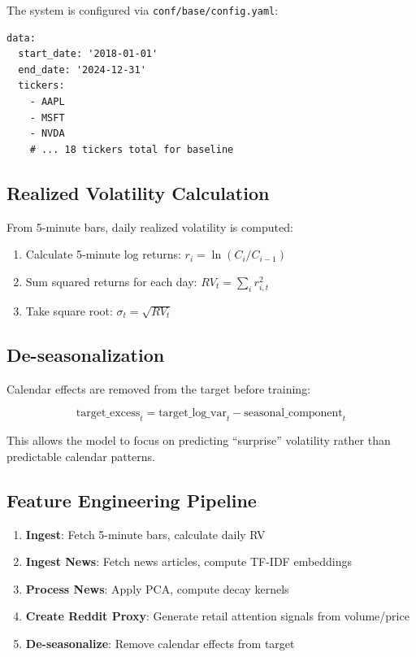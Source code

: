 \documentclass[12pt,a4paper]{article}
\begin{document}
The system is configured via \texttt{conf/base/config.yaml}:

\begin{lstlisting}
data:
  start_date: '2018-01-01'
  end_date: '2024-12-31'
  tickers:
    - AAPL
    - MSFT
    - NVDA
    # ... 18 tickers total for baseline
\end{lstlisting}

\subsection{Realized Volatility Calculation}

From 5-minute bars, daily realized volatility is computed:

\begin{enumerate}
    \item Calculate 5-minute log returns: $r_i = \ln(C_i / C_{i-1})$
    \item Sum squared returns for each day: $RV_t = \sum_i r_{i,t}^2$
    \item Take square root: $\sigma_t = \sqrt{RV_t}$
\end{enumerate}

\subsection{De-seasonalization}

Calendar effects are removed from the target before training:

\begin{equation}
    \text{target\_excess}_t = \text{target\_log\_var}_t - \text{seasonal\_component}_t
\end{equation}

This allows the model to focus on predicting ``surprise'' volatility rather than predictable calendar patterns.

\subsection{Feature Engineering Pipeline}

\begin{enumerate}
    \item \textbf{Ingest}: Fetch 5-minute bars, calculate daily RV
    \item \textbf{Ingest News}: Fetch news articles, compute TF-IDF embeddings
    \item \textbf{Process News}: Apply PCA, compute decay kernels
    \item \textbf{Create Reddit Proxy}: Generate retail attention signals from volume/price
    \item \textbf{De-seasonalize}: Remove calendar effects from target
\end{enumerate}
\end{document}
